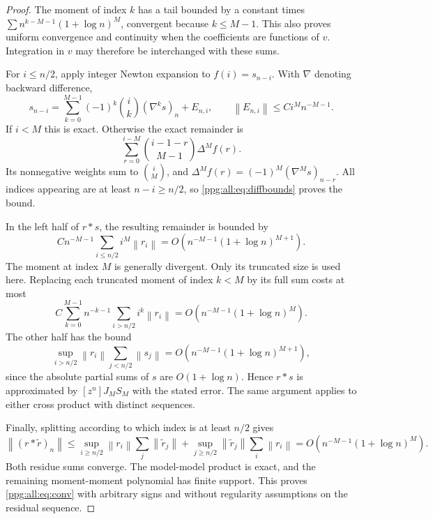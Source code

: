 \documentclass[11pt,letterpaper]{article}
\theoremstyle{remark}\newtheorem{remark}[theorem]{Remark}
\numberwithin{equation}{section}
\newcommand{\norm}[1]{\left\|#1\right\|}
\begin{document}
\begin{proof}
The moment of index $k$ has a tail bounded by a constant times
$\sum n^{k-M-1}(1+\log n)^M$, convergent because $k\le M-1$. This also proves uniform convergence and continuity when the coefficients are functions of $v$. Integration in $v$ may therefore be interchanged with these sums.

For $i\le n/2$, apply integer Newton expansion to $f(i)=s_{n-i}$. With $\nabla$ denoting backward difference,
\begin{equation}\label{ppg:all:eq:newtondiscrete}
 s_{n-i}=\sum_{k=0}^{M-1}(-1)^k\binom ik(\nabla^ks)_n+E_{n,i},
 \qquad \norm{E_{n,i}}\le C i^M n^{-M-1}.
\end{equation}
If $i<M$ this is exact. Otherwise the exact remainder is
\[
 \sum_{r=0}^{i-M}\binom{i-1-r}{M-1}\Delta^M f(r).
\]
Its nonnegative weights sum to $\binom iM$, and
$\Delta^Mf(r)=(-1)^M(\nabla^Ms)_{n-r}$. All indices appearing are at least $n-i\ge n/2$, so \eqref{ppg:all:eq:diffbounds} proves the bound.

In the left half of $r*s$, the resulting remainder is bounded by
\begin{equation}\label{ppg:all:eq:borderline}
 Cn^{-M-1}\sum_{i\le n/2}i^M\norm{r_i}
   =O\!\left(n^{-M-1}(1+\log n)^{M+1}\right).
\end{equation}
The moment at index $M$ is generally divergent. Only its truncated size is used here. Replacing each truncated moment of index $k<M$ by its full sum costs at most
\[
 C\sum_{k=0}^{M-1}n^{-k-1}\sum_{i>n/2}i^k\norm{r_i}
 =O\!\left(n^{-M-1}(1+\log n)^M\right).
\]
The other half has the bound
\[
 \sup_{i>n/2}\norm{r_i}\sum_{j<n/2}\norm{s_j}
 =O\!\left(n^{-M-1}(1+\log n)^{M+1}\right),
\]
since the absolute partial sums of $s$ are $O(1+\log n)$. Hence $r*s$ is approximated by $[z^n]J_MS_M$ with the stated error. The same argument applies to either cross product with distinct sequences.

Finally, splitting according to which index is at least $n/2$ gives
\[
 \norm{(r*\widetilde r)_n}
 \le\sup_{i\ge n/2}\norm{r_i}\sum_j\norm{\widetilde r_j}
   +\sup_{j\ge n/2}\norm{\widetilde r_j}\sum_i\norm{r_i}
 =O\!\left(n^{-M-1}(1+\log n)^M\right).
\]
Both residue sums converge. The model-model product is exact, and the remaining moment-moment polynomial has finite support. This proves \eqref{ppg:all:eq:conv} with arbitrary signs and without regularity assumptions on the residual sequence.
\end{proof}
\end{document}
